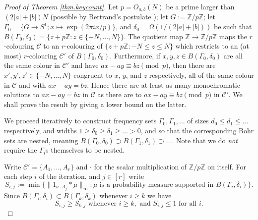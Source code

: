 \documentclass[12pt,reqno]{amsart}
\providecommand{\Z}{\mathbb{Z}}
\numberwithin{equation}{section}
\begin{document}
\begin{proof}[Proof of Theorem \ref{thm.keycount}]
 Let $p=O_{a,b}(N)$ be a prime larger than $(2|a|+|b|)N$ (possible by Bertrand's postulate \cite[Theorem 417, p343]{Hardy:1960aa}); let $G:=\Z/p\Z$; let $\Gamma_0=\{G \rightarrow S^1; x \mapsto \exp(2\pi i x/p)\}$, and $\delta_0=\Omega(1/(2|a|+|b|))$ be such that $B(\Gamma_0,\delta_0)=\{z+p\Z: z \in  \{-N,\dots,N\}\}$.  The quotient map $\Z \rightarrow \Z/p\Z$ maps the $r$-colouring $\mathcal{C}$ to an $r$-colouring of $\{z + p\Z: -N \leq z\leq N\}$ which restricts to an (at most) $r$-colouring $\mathcal{C}'$ of $B(\Gamma_0,\delta_0)$. Furthermore, if $x,y,z \in B(\Gamma_0,\delta_0)$ are all the same colour in $\mathcal{C}'$ and have $ax-ay\equiv bz \pmod p$, then there are $x',y',z' \in \{-N,\dots,N\}$ congruent to $x$, $y$, and $z$ respectively, all of the same colour in $\mathcal{C}$ and with $ax-ay=bz$. Hence there are at least as many monochromatic solutions to $ax-ay=bz$ in $\mathcal{C}$ as there are to $ax-ay\equiv bz \pmod p$ in $\mathcal{C}'$. We shall prove the result by giving a lower bound on the latter.
 
We proceed iteratively to construct frequency sets $\Gamma_0,\Gamma_1,\dots$ of sizes $d_0 \leq d_1\leq \dots$ respectively, and widths $1 \geq \delta_0 \geq \delta_1 \geq \dots >0$, and so that the corresponding Bohr sets are nested, meaning $B(\Gamma_0,\delta_0) \supset B(\Gamma_1,\delta_1)\supset \dots$. Note that we do \emph{not} require the $\Gamma_i$s themselves to be nested.

Write $\mathcal{C}'=\{A_1,\dots,A_r\}$ and $\cdot$ for the scalar multiplication of $\Z/p\Z$ on itself. For each step $i$ of the iteration, and $j \in [r]$ write
\begin{equation*}
S_{i,j}:=\min{\{\|1_{a \cdot A_j} \ast \mu\|_{\infty} : \mu \text{ is a probability measure supported in } B(\Gamma_i,\delta_i)\}}.
\end{equation*}
Since $B(\Gamma_i,\delta_i) \subset B(\Gamma_k,\delta_k)$ whenever $i \geq k$ we have
\begin{equation}\label{mon2}
S_{i,j} \geq S_{k,j}\text{ whenever }i \geq k, \text{ and } S_{i,j} \leq 1 \text{ for all }i.
\end{equation}


\end{proof}
\end{document}
